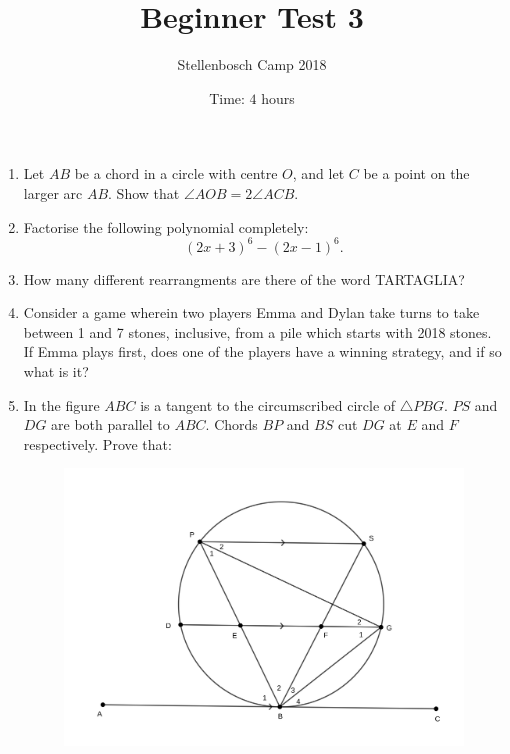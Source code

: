 \documentclass{article}
\title{Beginner Test 3}
\author{Stellenbosch Camp 2018}
\date{Time: $4$ hours}
\begin{document}
\maketitle

\begin{enumerate}[1.]

\vspace{6pt}
\item 
Let $AB$ be a chord in a circle with centre $O$, and let $C$ be a point on the larger arc $AB$. Show that $\angle AOB = 2\angle ACB$.


\vspace{6pt}
\item 
Factorise the following polynomial completely: \[ (2x+3)^6 -(2x-1)^6. \]


\item 
How many different rearrangments are there of the word TARTAGLIA?


\vspace{6pt}
\item 
Consider a game wherein two players Emma and Dylan take turns to take between 1 and 7 stones, inclusive, from a pile which starts with 2018 stones. If Emma plays first, does one of the players have a winning strategy, and if so what is it?


\vspace{6pt}
\item 
In the figure $ABC$ is a tangent to the circumscribed circle of $\triangle PBG$. $PS$ and $DG$ are both parallel to $ABC$. Chords $BP$ and $BS$ cut $DG$ at $E$ and $F$ respectively. Prove that:

\begin{figure}[H]
\centering
\includegraphics[width = 0.8\linewidth]{test3_geometry1.png}
\end{figure}


\end{enumerate}
\end{document}
